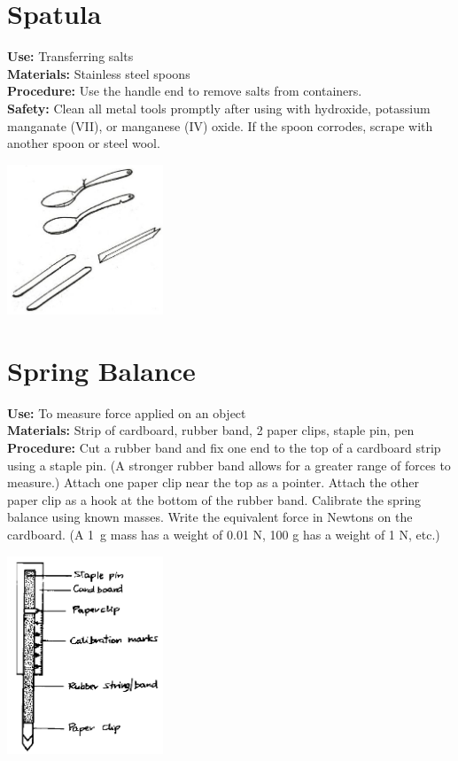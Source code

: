 \begin{multicols}{2}
\columnbreak

\section{Spatula} 
\label{sec:spatula}
\vspace{-10pt}
\textbf{Use:} Transferring salts\\
\textbf{Materials:} Stainless steel spoons\\
\textbf{Procedure:} Use the handle end to remove salts from containers.\\
\textbf{Safety:} Clean all metal tools promptly after using with hydroxide, 
potassium manganate (VII), 
or manganese (IV) oxide. 
If the spoon corrodes, scrape with another spoon or steel wool.
\begin{center}
\includegraphics[width=0.35\textwidth]{./img/source/spatula.jpg}
\end{center}

\section{Spring Balance} 
\label{sec:spring-balance}
\textbf{Use:} To measure force applied on an object\\
\textbf{Materials:} Strip of cardboard, rubber band, 2 paper clips, staple pin, pen\\
\textbf{Procedure:} Cut a rubber band and fix one end to the top of a cardboard strip using a staple pin. (A stronger rubber band allows for a greater range of forces to measure.) Attach one paper clip near the top as a pointer. Attach the other paper clip as a hook at the bottom of the rubber band. Calibrate the spring balance using known masses. Write the equivalent force in Newtons on the cardboard. (A 1~g mass has a weight of 0.01 N, 100 g has a weight of 1 N, etc.)
\begin{center}
\includegraphics[width=0.35\textwidth]{./img/source/spring-balance.png}
\end{center}


\end{multicols}
